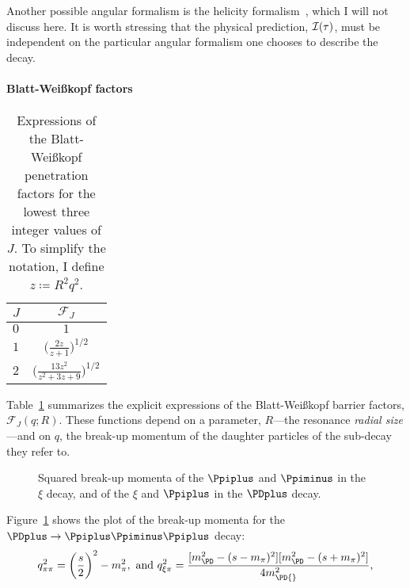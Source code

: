     Another possible angular formalism is the helicity formalism~\cite{jacob1959404}, which I will not discuss here.
    It is worth stressing that the physical prediction, $\mathcal{I}(\tau)$, must be independent on the particular angular formalism one chooses to describe the decay.


    \paragraph{Blatt-Wei\ss{}kopf factors}

    \begin{table}
        \centering
        \caption{Expressions of the Blatt-Wei\ss{}kopf penetration factors for the lowest three integer values of $J$. To simplify the notation, I define $z\coloneqq R^2 q^2$.}
        \label{table:blatt_weisskopf}
        \begin{tabular}{lc}
            \toprule
            $J$ &$\mathcal{F}_{\!J}$\\
            \midrule
            $0$ &$1$ \\
            $1$ &$\bigg(\displaystyle\frac{2z}{z + 1}\bigg)^{1/2}$ \\
            $2$ &$\bigg(\displaystyle\frac{13 z^2 }{z^2 + 3z + 9}\bigg)^{1/2}$ \\
            \bottomrule
        \end{tabular}
    \end{table}
    Table~\ref{table:blatt_weisskopf} summarizes the explicit expressions of the Blatt-Wei\ss{}kopf barrier factors, $\mathcal{F}_{\!J}(q; R)$.
    These functions depend on a parameter, $R$---the resonance \emph{radial size}---and on $q$, the break-up momentum of the daughter particles of the sub-decay they refer to.
    \begin{figure}
        \centering
        
        \caption{Squared break-up momenta of the $\Ppiplus$ and $\Ppiminus$ in the $\xi$ decay, and of the $\xi$ and $\Ppiplus$ in the $\PDplus$ decay.}
        \label{fig:break_up_momenta}
    \end{figure}
    Figure~\ref{fig:break_up_momenta} shows the plot of the break-up momenta for the $\PDplus\to\Ppiplus\Ppiminus\Ppiplus$ decay:
    \begin{equation}
        q_{\pi\pi}^2 = \bigg(\frac{s}{2}\bigg)^2 - m_{\pi}^2,
        \text{ and }
        q_{\xi\pi}^2 = \frac{[m_{\PD}^2 - (s - m_\pi)^2][m_{\PD}^2 - (s+m_\pi)^2]}{4m_{\PD{}}^2},
    \end{equation}
